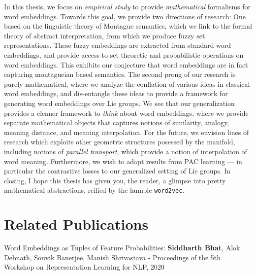 \documentclass[11pt]{book}
\begin{document}
In this thesis, we focus on \emph{empirical study} to provide
\emph{mathematical} formalisms for word embeddings. Towards this goal, we
provide two directions of research: One based on the linguistic theory of
Montague semantics, which we link to the formal theory of abstract
interpretation, from which we produce fuzzy set representations. These fuzzy
embeddings are extracted from standard word embeddings, and provide access to
set theoretic and probabilistic operations on word embeddings. This exhibits
our conjecture that word embeddings are in fact capturing montagueian based
semantics. The second prong of our research is purely mathematical, where we
analyze the conflation of various ideas in classical word embeddings, and
dis-entangle these ideas to provide a framework for generating word embeddings
over Lie groups.  We see that our generalization provides a cleaner framework
to \emph{think} about word embeddings, where we provide separate mathematical
objects that captures notions of similarity, analogy, meaning distance, and
meaning interpolation.  For the future, we envision lines of research which
exploits other geometric structures posessed by the manifold, including notions
of \emph{parallel transport}, which provide a notion of interpolation of word
meaning. Furthermore, we wish to adapt results from PAC learning --- in
particular the contrastive losses \cite{arora2019theoretical} to our
generalized setting of Lie groups.  In closing, I hope this thesis has given
you, the reader, a glimpse into pretty mathematical abstractions, reified by
the humble \texttt{word2vec}.


\chapter*{Related Publications}
\label{ch:relatedPubs}
% 


Word Embeddings as Tuples of Feature Probabilities: \textbf{Siddharth Bhat},
Alok Debnath, Souvik Banerjee, Manish Shrivastava - Proceedings of the 5th
Workshop on Representation Learning for NLP, 2020


\nocite{*}

% 

\end{document}
